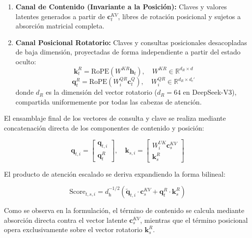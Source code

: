 \begin{enumerate}
    \item \textbf{Canal de Contenido (Invariante a la Posición):} Claves y valores latentes generados a partir de $\mathbf{c}_t^{KV}$, libres de rotación posicional y sujetos a absorción matricial completa.
    \item \textbf{Canal Posicional Rotatorio:} Claves y consultas posicionales desacopladas de baja dimensión, proyectadas de forma independiente a partir del estado oculto:
    \begin{equation}
    \mathbf{k}_t^R = \mathrm{RoPE}\left( W^{KR} \mathbf{h}_t \right), \quad W^{KR} \in \mathbb{R}^{d_R \times d}
    \end{equation}
    \begin{equation}
    \mathbf{q}_t^R = \mathrm{RoPE}\left( W^{QR}_i \mathbf{c}_t^Q \right), \quad W^{QR}_i \in \mathbb{R}^{d_R \times d_c'}
    \end{equation}
    donde $d_R$ es la dimensión del vector rotatorio ($d_R = 64$ en DeepSeek-V3), compartida uniformemente por todas las cabezas de atención.
\end{enumerate}

El ensamblaje final de los vectores de consulta y clave se realiza mediante concatenación directa de los componentes de contenido y posición:

\begin{equation}
\mathbf{q}_{t,i} = \left[ \begin{array}{c} \mathbf{q}_{t,i} \\ \mathbf{q}_t^R \end{array} \right], \quad \mathbf{k}_{s,i} = \left[ \begin{array}{c} W^{UK}_i \mathbf{c}_s^{KV} \\ \mathbf{k}_s^R \end{array} \right]
\end{equation}

El producto de atención escalado se deriva expandiendo la forma bilineal:

\begin{equation}
\mathrm{Score}_{t,s,i} = d_{\mathrm{h}}^{-1/2} \left( \tilde{\mathbf{q}}_{t,i} \cdot \mathbf{c}_s^{KV} + \mathbf{q}_t^R \cdot \mathbf{k}_s^R \right)
\end{equation}

Como se observa en la formulación, el término de contenido se calcula mediante absorción directa contra el vector latente $\mathbf{c}_s^{KV}$, mientras que el término posicional opera exclusivamente sobre el vector rotatorio $\mathbf{k}_s^R$. 

